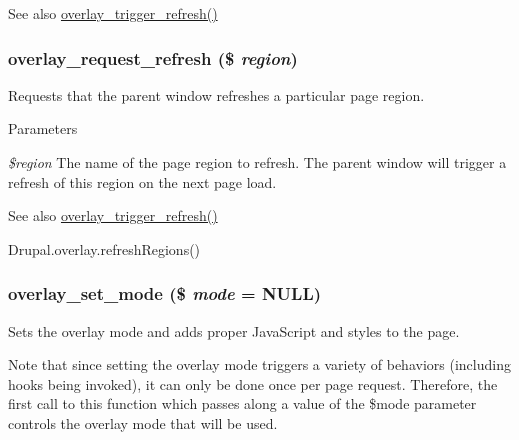 \begin{DoxySeeAlso}{See also}
\hyperlink{overlay_8module_ae3025a7d3191c492aa55e2bcf1518e67}{overlay\_\-trigger\_\-refresh()} 
\end{DoxySeeAlso}
\hypertarget{overlay_8module_aed708a9891795f894ceaba04627c752c}{
\subsubsection[{overlay\_\-request\_\-refresh}]{\setlength{\rightskip}{0pt plus 5cm}overlay\_\-request\_\-refresh (\$ {\em region})}}
\label{overlay_8module_aed708a9891795f894ceaba04627c752c}
Requests that the parent window refreshes a particular page region.


\begin{DoxyParams}{Parameters}
\item[{\em \$region}]The name of the page region to refresh. The parent window will trigger a refresh of this region on the next page load.\end{DoxyParams}
\begin{DoxySeeAlso}{See also}
\hyperlink{overlay_8module_ae3025a7d3191c492aa55e2bcf1518e67}{overlay\_\-trigger\_\-refresh()} 

Drupal.overlay.refreshRegions() 
\end{DoxySeeAlso}
\hypertarget{overlay_8module_a140f35bbeb7988cef4be585beba86348}{
\subsubsection[{overlay\_\-set\_\-mode}]{\setlength{\rightskip}{0pt plus 5cm}overlay\_\-set\_\-mode (\$ {\em mode} = {\ttfamily NULL})}}
\label{overlay_8module_a140f35bbeb7988cef4be585beba86348}
Sets the overlay mode and adds proper JavaScript and styles to the page.

Note that since setting the overlay mode triggers a variety of behaviors (including hooks being invoked), it can only be done once per page request. Therefore, the first call to this function which passes along a value of the \$mode parameter controls the overlay mode that will be used.


